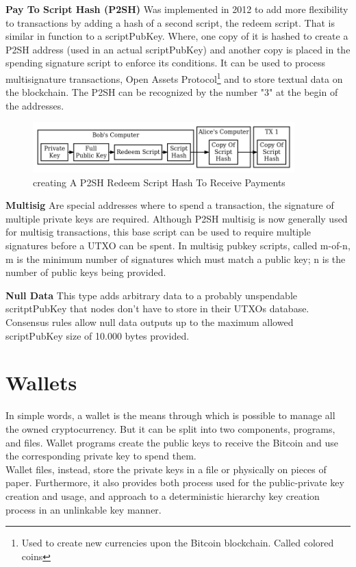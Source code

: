 \textbf{Pay To Script Hash (P2SH)}
Was implemented in 2012 to add more flexibility to transactions by adding a hash 
of a second script, the redeem script. That is similar in function to a 
scriptPubKey. Where, one copy of it is hashed to create a P2SH address (used in an actual 
scriptPubKey) and another copy is placed in the spending signature script to enforce 
its conditions. It can be used to process multisignature transactions, 
Open Assets Protocol\footnote{Used to create new currencies upon the Bitcoin blockchain. 
Called colored coins} and to store textual data on the blockchain. The P2SH can 
be recognized by the number "3" at the begin of the addresses.\cite{bitcoin.org}\\

\begin{figure}[h]
    \centering
    \includegraphics[width = 0.9\textwidth]{p2sh.png}
    \caption{creating A P2SH Redeem Script Hash To Receive Payments \cite{bitcoin.org}}
    \label{fig:p2sh}
\end{figure}\bigskip
\textbf{Multisig}
Are special addresses where to spend a transaction, the signature of multiple private keys are required.
Although P2SH multisig is now generally used for multisig transactions, this base 
script can be used to require multiple signatures before a UTXO can be spent.
In multisig pubkey scripts, called m-of-n, m is the minimum number of signatures 
which must match a public key; n is the number of public keys being provided.\cite{bitcoin.org}\\
\bigskip 

\textbf{Null Data}
This type adds arbitrary data to a probably unspendable scritptPubKey that nodes don't have
to store in their UTXOs database. Consensus rules allow null data outputs up to the maximum
allowed scriptPubKey size of 10.000 bytes provided.\cite{bitcoin.org}

\section{Wallets}
\label{sec:wallets}
In simple words, a wallet is the means through which is possible to manage all the 
owned cryptocurrency. But it can be split into two components, programs, and files.
Wallet programs create the public keys to receive the Bitcoin and use the 
corresponding private key to spend them.\\ 
Wallet files, instead, store the private keys in a file or physically on pieces of paper. 
Furthermore, it also provides both process used for the public-private key creation and 
usage, and approach to a deterministic hierarchy key creation process in an unlinkable
key manner.
\newpage


